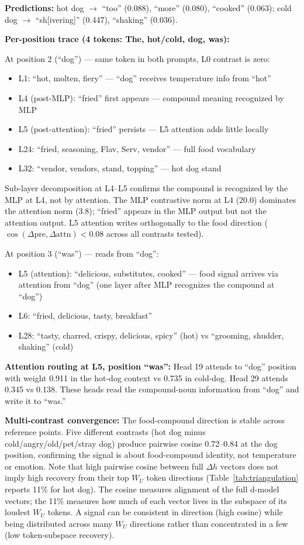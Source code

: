 \documentclass[11pt]{article}
\newcommand{\dhh}{\Delta h}
\newcommand{\WU}{W_U}
\begin{document}
\textbf{Predictions:} hot dog $\rightarrow$ ``too'' (0.088), ``more'' (0.080), ``cooked'' (0.063);
cold dog $\rightarrow$ ``sh[ivering]'' (0.447), ``shaking'' (0.036).

\textbf{Per-position trace (4 tokens: The, hot/cold, dog, was):}

At position 2 (``dog'') --- same token in both prompts, L0 contrast is zero:
\begin{itemize}[leftmargin=*]
\item L1: ``hot, molten, fiery'' --- ``dog'' receives temperature info from ``hot''
\item L4 (post-MLP): ``fried'' first appears --- compound meaning recognized by MLP
\item L5 (post-attention): ``fried'' persists --- L5 attention adds little locally
\item L24: ``fried, seasoning, Flav, Serv, vendor'' --- full food vocabulary
\item L32: ``vendor, vendors, stand, topping'' --- hot dog stand
\end{itemize}

Sub-layer decomposition at L4--L5 confirms the compound is recognized by the
MLP at L4, not by attention. The MLP contrastive norm at L4 (20.0) dominates
the attention norm (3.8); ``fried'' appears in the MLP output but not the
attention output. L5 attention writes orthogonally to the food direction
($\cos(\Delta\text{pre}, \Delta\text{attn}) < 0.08$ across all contrasts tested).

At position 3 (``was'') --- reads from ``dog'':
\begin{itemize}[leftmargin=*]
\item L5 (attention): ``delicious, substitutes, cooked'' --- food signal arrives via
  attention from ``dog'' (one layer after MLP recognizes the compound at ``dog'')
\item L6: ``fried, delicious, tasty, breakfast''
\item L28: ``tasty, charred, crispy, delicious, spicy'' (hot) vs ``grooming, shudder, shaking'' (cold)
\end{itemize}

\textbf{Attention routing at L5, position ``was'':}
Head 19 attends to ``dog'' position with weight 0.911 in the hot-dog context vs
0.735 in cold-dog. Head 29 attends 0.345 vs 0.138. These heads read the
compound-noun information from ``dog'' and write it to ``was.''

\textbf{Multi-contrast convergence:} The food-compound direction is stable across
reference points. Five different contrasts (hot dog minus cold/angry/old/pet/stray
dog) produce pairwise cosine 0.72--0.84 at the dog position, confirming
the signal is about food-compound identity, not temperature or emotion. Note
that high pairwise cosine between full $\dhh$ vectors does not imply high
recovery from their top $\WU$ token directions (Table~\ref{tab:triangulation} reports 11\% for hot
dog). The cosine measures alignment of the full d-model vectors; the 11\%
measures how much of each vector lives in the subspace of its loudest $\WU$
tokens. A signal can be consistent in direction (high cosine) while being
distributed across many $\WU$ directions rather than concentrated in a few
(low token-subspace recovery).
\end{document}
